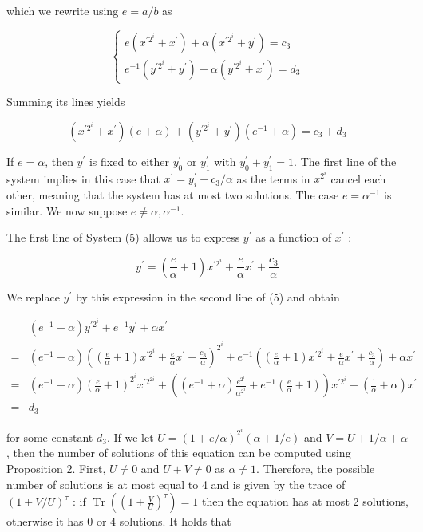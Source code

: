 \documentclass[10pt]{article}
\begin{document}
which we rewrite using $e=a / b$ as

\[
\left\{\begin{array}{l}
e\left(x^{\prime 2^{i}}+x^{\prime}\right)+\alpha\left(x^{\prime 2^{i}}+y^{\prime}\right)=c_{3}  \tag{5}\\
e^{-1}\left(y^{\prime 2^{i}}+y^{\prime}\right)+\alpha\left(y^{\prime 2^{i}}+x^{\prime}\right)=d_{3}
\end{array}\right.
\]

Summing its lines yields

$$
\left(x^{\prime 2^{i}}+x^{\prime}\right)(e+\alpha)+\left(y^{\prime 2^{i}}+y^{\prime}\right)\left(e^{-1}+\alpha\right)=c_{3}+d_{3}
$$

If $e=\alpha$, then $y^{\prime}$ is fixed to either $y_{0}^{\prime}$ or $y_{1}^{\prime}$ with $y_{0}^{\prime}+y_{1}^{\prime}=1$. The first line of the system implies in this case that $x^{\prime}=y_{i}^{\prime}+c_{3} / \alpha$ as the terms in $x^{2^{i}}$ cancel each other, meaning that the system has at most two solutions. The case $e=\alpha^{-1}$ is similar. We now suppose $e \neq \alpha, \alpha^{-1}$.

The first line of System (5) allows us to express $y^{\prime}$ as a function of $x^{\prime}$ :

$$
y^{\prime}=\left(\frac{e}{\alpha}+1\right) x^{\prime 2^{i}}+\frac{e}{\alpha} x^{\prime}+\frac{c_{3}}{\alpha}
$$

We replace $y^{\prime}$ by this expression in the second line of (5) and obtain

$$
\begin{aligned}
& \left(e^{-1}+\alpha\right) y^{\prime 2^{i}}+e^{-1} y^{\prime}+\alpha x^{\prime} \\
= & \left(e^{-1}+\alpha\right)\left(\left(\frac{e}{\alpha}+1\right) x^{\prime 2^{i}}+\frac{e}{\alpha} x^{\prime}+\frac{c_{3}}{\alpha}\right)^{2^{i}}+e^{-1}\left(\left(\frac{e}{\alpha}+1\right) x^{\prime 2^{i}}+\frac{e}{\alpha} x^{\prime}+\frac{c_{3}}{\alpha}\right)+\alpha x^{\prime} \\
= & \left(e^{-1}+\alpha\right)\left(\frac{e}{\alpha}+1\right)^{2^{i}} x^{\prime 2^{2 i}}+\left(\left(e^{-1}+\alpha\right) \frac{e^{2^{i}}}{\alpha^{2^{i}}}+e^{-1}\left(\frac{e}{\alpha}+1\right)\right) x^{\prime 2^{i}}+\left(\frac{1}{\alpha}+\alpha\right) x^{\prime} \\
= & d_{3}
\end{aligned}
$$

for some constant $d_{3}$. If we let $U=(1+e / \alpha)^{2^{i}}(\alpha+1 / e)$ and $V=U+1 / \alpha+\alpha$, then the number of solutions of this equation can be computed using Proposition 2. First, $U \neq 0$ and $U+V \neq 0$ as $\alpha \neq 1$. Therefore, the possible number of solutions is at most equal to 4 and is given by the trace of $(1+V / U)^{\tau}$ : if $\operatorname{Tr}\left(\left(1+\frac{V}{U}\right)^{\tau}\right)=1$ then the equation has at most 2 solutions, otherwise it has 0 or 4 solutions. It holds that
\end{document}
